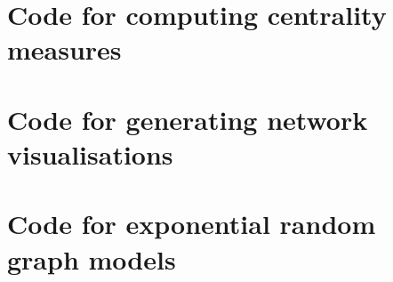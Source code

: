 
\section{Code for computing centrality measures }

\section{Code for generating network visualisations}

\section{Code for exponential random graph models}